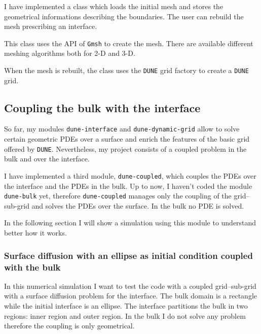 \documentclass[a4paper,11pt, onecolumn]{article}
\begin{document}
I have implemented a class which loads the initial mesh and stores the
geometrical informations describing the boundaries. The user can rebuild the
mesh prescribing an interface.

This class uses the API of \verb|Gmsh| \cite{GeuzaineR09} to create the mesh.
There are available different meshing algorithms both for 2-D and 3-D.

When the mesh is rebuilt, the class uses the \verb|DUNE| grid factory to create
a \verb|DUNE| grid.

\subsection{Coupling the bulk with the interface}

So far, my modules \verb|dune-interface| and \verb|dune-dynamic-grid| allow to
solve certain geometric PDEs over a surface and enrich the features of the basic
grid offered by \verb|DUNE|. Nevertheless, my project consists of a coupled
problem in the bulk and over the interface.
\newline

I have implemented a third module, \verb|dune-coupled|, which couples the PDEs
over the interface and the PDEs in the bulk. Up to now, I haven't coded the
module \verb|dune-bulk| yet, therefore \verb|dune-coupled| manages only the
coupling of the grid--sub-grid and solves the PDEs over the surface. In the bulk
no PDE is solved.
\newline

In the following section I will show a simulation using this module to
understand better how it works.

\subsubsection{Surface diffusion with an ellipse as initial condition coupled
with the bulk}

In this numerical simulation I want to test the code with a coupled
grid--sub-grid  with a surface diffusion problem for the interface. The bulk
domain is a rectangle while the initial interface is an ellipse. The interface
partitions the bulk in two regions: inner region and outer region. In the bulk I
do not solve any problem therefore the coupling is only geometrical.
\newline
\end{document}

